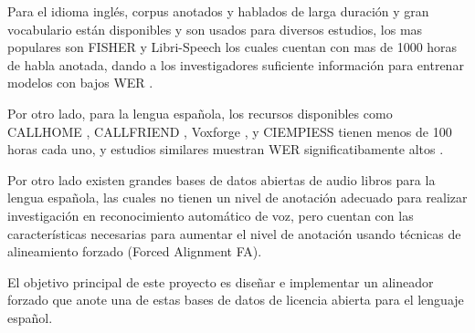 Para el idioma inglés, corpus anotados y hablados de larga duración y gran vocabulario están disponibles y son usados para diversos estudios, los mas populares son FISHER \cite{CieriTheSpeech-to-Text} y Libri-Speech  \cite{PanayotovLIBRISPEECH:BOOKS}  los cuales cuentan con mas de 1000 horas de habla anotada, dando a los investigadores suficiente información para entrenar modelos con bajos WER \cite{HannunDeepRecognition}.

Por otro lado, para la lengua española, los recursos disponibles como CALLHOME \cite{CALLHOMESpa}, CALLFRIEND  \cite{CALLFRIENDSpa}, Voxforge \cite{Voxforge.org}, y CIEMPIESS \cite{Hernandez-MenaCIEMPIESS:Corpus} tienen menos de 100 horas cada uno, y estudios similares muestran WER significatibamente altos \cite{Hernandez-Mena2017AutomaticResources}.

Por otro lado existen grandes bases de datos abiertas de audio libros para la lengua española, las cuales no tienen un nivel de anotación adecuado para realizar investigación en reconocimiento automático de voz, pero cuentan con las características necesarias para aumentar el nivel de anotación usando técnicas de alineamiento forzado (Forced Alignment FA). 

El objetivo principal de este proyecto es diseñar e implementar un alineador forzado que anote una de estas bases de datos de licencia abierta para el lenguaje español.

